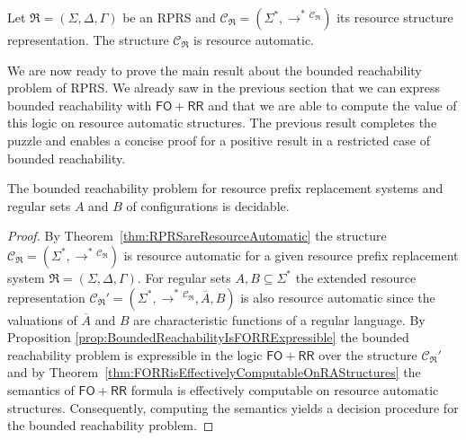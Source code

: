 \documentclass{LMCS}
\newcommand{\pathTo}[1][]{\xrightarrow{#1}^*}
\newcommand{\prsR}{\mathfrak R}
\newcommand{\FORR}{\ensuremath{\mathsf{FO\!\!+\!\!RR}}}
\newcommand{\RPRS}{\textsf{RPRS}}
\newcommand{\resRep}[1]{\mathcal C_{#1}}
\begin{document}
\begin{thm}\label{thm:RPRSareResourceAutomatic}
	Let $\prsR = (\Sigma,\Delta,\Gamma)$ be an \RPRS{} and $\resRep{\prsR} =
   (\Sigma^*,\pathTo{}^{\resRep{\prsR}})$ its resource structure representation.
   The structure $\resRep{\prsR}$ is resource automatic.
\end{thm}

We are now ready to prove the main result about the bounded reachability
problem of \RPRS{}.  We already saw in the previous section that we can express bounded
reachability with \FORR{} and that we are able to compute the value of this
logic on resource automatic structures. The previous result completes the
puzzle and enables a concise proof for a positive result in a restricted case of
bounded reachability.

\begin{thm}\label{thm:BoundedReachabilityIsDecidable}
	The bounded reachability problem for resource prefix replacement systems 
    and regular sets $A$ and $B$ of configurations is decidable.
\end{thm}
\begin{proof}
	By Theorem~\ref{thm:RPRSareResourceAutomatic} the structure
$\resRep{\prsR} = (\Sigma^*,\pathTo{}^{\resRep{\prsR}})$ is resource automatic for a given resource
prefix replacement system $\prsR = (\Sigma,\Delta,\Gamma)$. For regular sets
$A, B \subseteq \Sigma^*$ the extended resource representation $\resRep{\prsR}'
= (\Sigma^*, \pathTo{}^{\resRep{\prsR}}, \overline{A}, B)$ is also resource automatic since the
valuations of $\overline{A}$ and $B$ are characteristic functions of a
regular language. 
	By Proposition \ref{prop:BoundedReachabilityIsFORRExpressible} the bounded
reachability problem is expressible in the logic \FORR{} over the structure
$\resRep{\prsR}'$ and by
Theorem~\ref{thm:FORRisEffectivelyComputableOnRAStructures} the semantics of
\FORR{} formula is effectively computable on resource automatic structures.
Consequently, computing the semantics yields a decision procedure for the
bounded reachability problem.
\end{proof}
\end{document}
